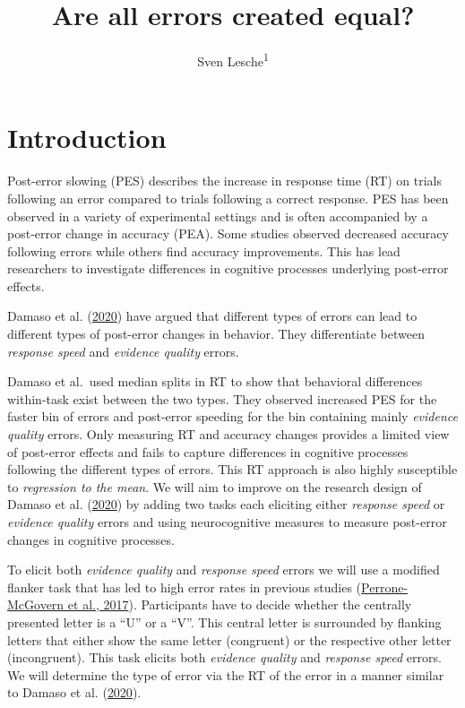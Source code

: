 \documentclass[
  man,floatsintext]{apa7}
\title{Are all errors created equal?}
\author{Sven Lesche\textsuperscript{1}}
\date{}
\affiliation{\vspace{0.5cm}\textsuperscript{1} Ruprecht-Karls-University Heidelberg}
\begin{document}
\maketitle

\hypertarget{introduction}{%
\section{Introduction}\label{introduction}}

Post-error slowing (PES) describes the increase in response time (RT) on trials following an error compared to trials following a correct response. PES has been observed in a variety of experimental settings and is often accompanied by a post-error change in accuracy (PEA). Some studies observed decreased accuracy following errors while others find accuracy improvements. This has lead researchers to investigate differences in cognitive processes underlying post-error effects.

Damaso et al. (\protect\hyperlink{ref-damaso2020}{2020}) have argued that different types of errors can lead to different types of post-error changes in behavior. They differentiate between \emph{response speed} and \emph{evidence quality} errors.

Damaso et al.~used median splits in RT to show that behavioral differences within-task exist between the two types. They observed increased PES for the faster bin of errors and post-error speeding for the bin containing mainly \emph{evidence quality} errors. Only measuring RT and accuracy changes provides a limited view of post-error effects and fails to capture differences in cognitive processes following the different types of errors. This RT approach is also highly susceptible to \emph{regression to the mean}. We will aim to improve on the research design of Damaso et al. (\protect\hyperlink{ref-damaso2020}{2020}) by adding two tasks each eliciting either \emph{response speed} or \emph{evidence quality} errors and using neurocognitive measures to measure post-error changes in cognitive processes.

To elicit both \emph{evidence quality} and \emph{response speed} errors we will use a modified flanker task that has led to high error rates in previous studies (\protect\hyperlink{ref-perrone2017influence}{Perrone-McGovern et al., 2017}). Participants have to decide whether the centrally presented letter is a ``U'' or a ``V''. This central letter is surrounded by flanking letters that either show the same letter (congruent) or the respective other letter (incongruent). This task elicits both \emph{evidence quality} and \emph{response speed} errors. We will determine the type of error via the RT of the error in a manner similar to Damaso et al. (\protect\hyperlink{ref-damaso2020}{2020}).
\end{document}
